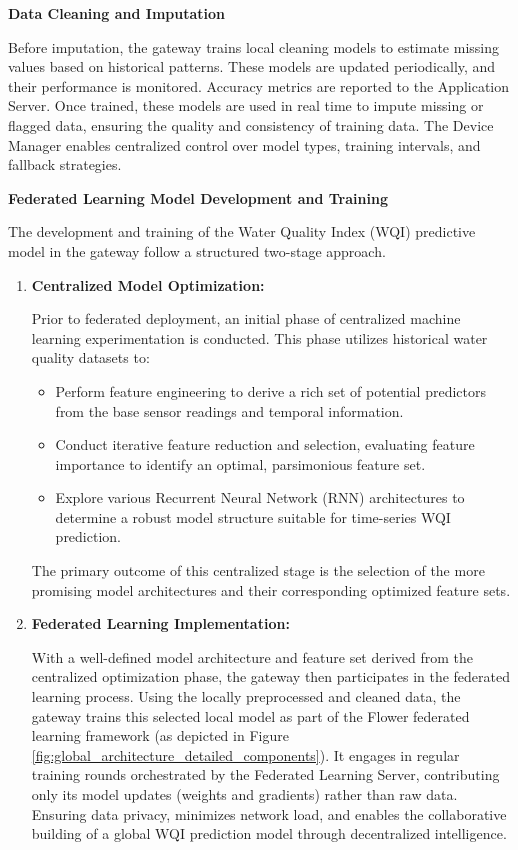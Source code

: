 \textbf{Data Cleaning and Imputation}

Before imputation, the gateway trains local cleaning models to estimate missing values based on historical patterns. These models are updated periodically, and their performance is monitored. Accuracy metrics are reported to the Application Server. Once trained, these models are used in real time to impute missing or flagged data, ensuring the quality and consistency of training data. The Device Manager enables centralized control over model types, training intervals, and fallback strategies.

\textbf{Federated Learning Model Development and Training}

\label{par:fl_model_dev_train} %
The development and training of the Water Quality Index (WQI) predictive model in the gateway follow a structured two-stage approach.
\begin{enumerate}
    \item \textbf{Centralized Model Optimization:}
    
        Prior to federated deployment, an initial phase of centralized machine learning experimentation is conducted. This phase utilizes historical water quality datasets to:
        \begin{itemize}
            \item Perform feature engineering to derive a rich set of potential predictors from the base sensor readings and temporal information.
            \item Conduct iterative feature reduction and selection, evaluating feature importance to identify an optimal, parsimonious feature set.
            \item Explore various Recurrent Neural Network (RNN) architectures to determine a robust model structure suitable for time-series WQI prediction.
        \end{itemize}
        The primary outcome of this centralized stage is the selection of the more promising model architectures and their corresponding optimized feature sets.
    \item \textbf{Federated Learning Implementation:}
    
        With a well-defined model architecture and feature set derived from the centralized optimization phase, the gateway then participates in the federated learning process. Using the locally preprocessed and cleaned data, the gateway trains this selected local model as part of the Flower federated learning framework (as depicted in Figure \ref{fig:global_architecture_detailed_components}). It engages in regular training rounds orchestrated by the Federated Learning Server, contributing only its model updates (weights and gradients) rather than raw data. Ensuring data privacy, minimizes network load, and enables the collaborative building of a global WQI prediction model through decentralized intelligence.
\end{enumerate}

